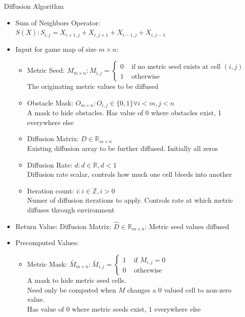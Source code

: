 \documentclass{beamer}
\begin{document}
\begin{frame}{Diffusion Algorithm}\fontsize{6pt}{7}\selectfont
 
 \begin{itemize}\fontsize{6pt}{7}\selectfont
  \item Sum of Neighbors Operator: \\$ S(X): S_{i,j} = X_{i+1,j} + X_{i,j+1} + X_{i-1,j} + X_{i,j-1} $
  \item Input for game map of size $m \times n$:
    \begin{itemize}\fontsize{6pt}{7}\selectfont
     \item Metric Seed: $M_{m \times n}: M_{i,j} = \left\{ \begin{array}{rl}
0 &\mbox{ if no metric seed exists at cell }(i,j) \\
1 &\mbox{ otherwise}
\end{array} \right.$ \\ The originating metric values to be diffused
     \item Obstacle Mask: $O_{m \times n}: O_{i,j} \in \{0,1\} \forall i<m, j<n$ \\ A mask to hide obstacles.  Has value of 0 where obstacles exist, 1 everywhere else
     \item Diffusion Matrix: $D\in \mathbb{R}_{m \times n}$ \\ Existing diffusion array to be further diffused.  Initially all zeros
     \item Diffusion Rate: $d: d \in \mathbb{R},  d < 1$ \\ Diffusion rate scalar, controls how much one cell bleeds into another
     \item Iteration count: $i: i \in \mathbb{Z}, i > 0$ \\ Numer of diffusion iterations to apply.  Controls rate at which metric diffuses through environment
    \end{itemize}
  \item Return Value: Diffusion Matrix: $\hat D \in \mathbb{R}_{m \times n}$: Metric seed values diffused
  \item Precomputed Values:
      \begin{itemize}\fontsize{6pt}{7}\selectfont
	\item Metric Mask: $\bar M_{m \times n}: \bar M_{i,j} =  \left\{ \begin{array}{rl}
1 &\mbox{ if $M_{i,j} = 0$} \\
0 &\mbox{ otherwise}
\end{array} \right.$ \\ A mask to hide metric seed cells.\\Need only be computed when $M$ changes a 0 valued cell to non-zero value.\\Has value of 0 where metric seeds exist, 1 everywhere else

\end{itemize}
\end{itemize}
\end{frame}
\end{document}

